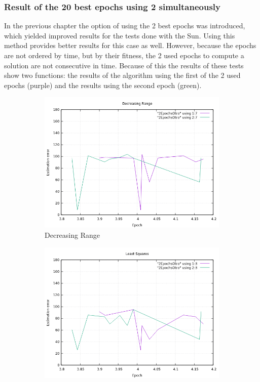 \clearpage
\subsubsection{Result of the 20 best epochs using 2 simultaneously}

In the previous chapter the option of using the 2 best epochs was introduced, which yielded improved results for the tests done with the Sun. Using this method provides better results for this case as well. However, 
because the epochs are not ordered by time, but by their fitness, the 2 used epochs to compute a solution are not consecutive in time. Because of this the results of these tests show two functions: the results of the algorithm using the first of the 2 used epochs (purple) and the results using the second epoch (green).

\begin{figure}[!htb]
	\begin{subfigure}[b]{0.5\textwidth}
		\includegraphics[width=\linewidth]{images/resultsStellar/20Epochs2Epochs/2EpochsOtroDR.png}
		\caption{Decreasing Range}
	\end{subfigure}
	\hfill
	\begin{subfigure}[b]{0.5\textwidth}
		\includegraphics[width=\linewidth]{images/resultsStellar/20Epochs2Epochs/2EpochsOtroLS1.png}

\end{subfigure}
\end{figure}
